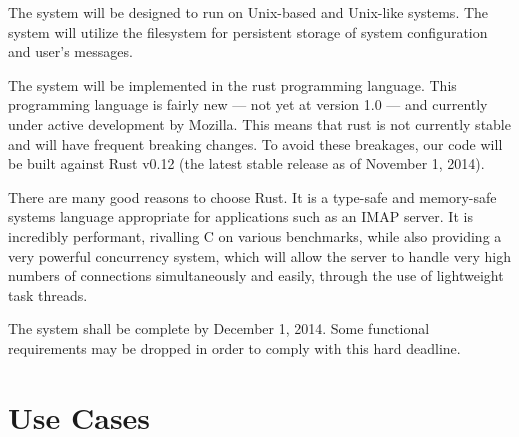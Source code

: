 \documentclass[a4paper,12pt]{article}
\begin{document}
The system will be designed to run on Unix-based and Unix-like systems. The system will utilize the filesystem for persistent storage of system configuration and user's messages.

The system will be implemented in the  rust programming language. This programming language is fairly new --- not yet at version 1.0 --- and currently under active development by Mozilla. This means that rust is not currently stable and will have frequent breaking changes. To avoid these breakages, our code will be built against Rust v0.12 (the latest stable release as of November 1, 2014).

There are many good reasons to choose Rust. It is a type-safe and memory-safe systems language appropriate for applications such as an IMAP server. It is incredibly performant, rivalling C on various benchmarks, while also providing a very powerful concurrency system, which will allow the server to handle very high numbers of connections simultaneously and easily, through the use of lightweight task threads.

The system shall be complete by December 1, 2014. Some functional requirements may be dropped in order to comply with this hard deadline.

\newpage

\section*{Use Cases}
\end{document}
